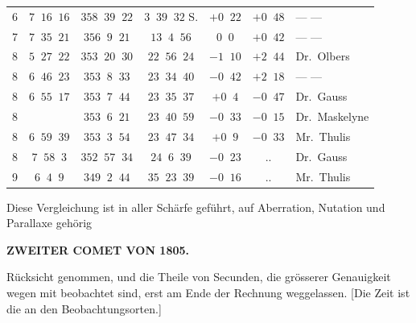 \begin{center}
\begin{tabular}{|c|c|c|c|c|c|l|}
6 & $7\;\;16\;\;16$ & $358\;\;39\;\;22$ & $3\;\;39\;\;32$ S. & $+0\;\;22$ & $+0\;\;48$ & --- --- \\
7 & $7\;\;35\;\;21$ & $356\;\;9\;\;21$ & $13\;\;4\;\;56$ & $0\;\;0$ & $+0\;\;42$ & --- --- \\
8 & $5\;\;27\;\;22$ & $353\;\;20\;\;30$ & $22\;\;56\;\;24$ & $-1\;\;10$ & $+2\;\;44$ & Dr.\ Olbers \\
8 & $6\;\;46\;\;23$ & $353\;\;8\;\;33$ & $23\;\;34\;\;40$ & $-0\;\;42$ & $+2\;\;18$ & --- --- \\
8 & $6\;\;55\;\;17$ & $353\;\;7\;\;44$ & $23\;\;35\;\;37$ & $+0\;\;4$ & $-0\;\;47$ & Dr.\ Gauss \\
8 & & $353\;\;6\;\;21$ & $23\;\;40\;\;59$ & $-0\;\;33$ & $-0\;\;15$ & Dr.\ Maskelyne \\
8 & $6\;\;59\;\;39$ & $353\;\;3\;\;54$ & $23\;\;47\;\;34$ & $+0\;\;9$ & $-0\;\;33$ & Mr.\ Thulis \\
8 & $7\;\;58\;\;3$ & $352\;\;57\;\;34$ & $24\;\;6\;\;39$ & $-0\;\;23$ & .\quad . & Dr.\ Gauss \\
9 & $6\;\;4\;\;9$ & $349\;\;2\;\;44$ & $35\;\;23\;\;39$ & $-0\;\;16$ & .\quad . & Mr.\ Thulis \\
\hline
\end{tabular}\endgroup\end{center}



\par\indent Diese Vergleichung ist in aller Schärfe geführt, auf Aberration, Nutation und Parallaxe gehörig
\par\clearpage
\thispagestyle{empty}
\noindent{}%
%
\parbox[t]{\dimexpr\linewidth-24mm\relax}{\centering\footnotesize\bfseries ZWEITER COMET VON 1805.\par}%
\makebox[12mm][r]{}\par\nobreak\medskip
\noindent Rücksicht genommen, und die Theile von Secunden, die grösserer Genauigkeit wegen mit beobachtet
sind, erst am Ende der Rechnung weggelassen. [Die Zeit ist die an den Beobachtungsorten.]

